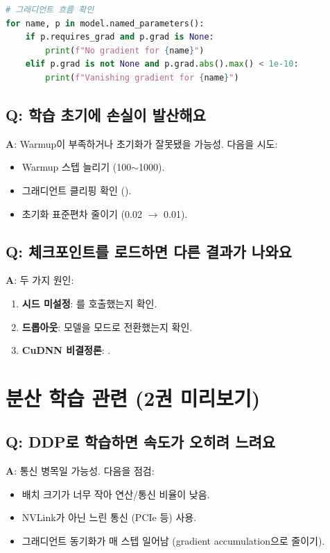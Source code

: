 \begin{lstlisting}[language=Python]
# 그래디언트 흐름 확인
for name, p in model.named_parameters():
    if p.requires_grad and p.grad is None:
        print(f"No gradient for {name}")
    elif p.grad is not None and p.grad.abs().max() < 1e-10:
        print(f"Vanishing gradient for {name}")
\end{lstlisting}

\subsection{Q: 학습 초기에 손실이 발산해요}

\textbf{A}: Warmup이 부족하거나 초기화가 잘못됐을 가능성. 다음을 시도:
\begin{itemize}
  \item Warmup 스텝 늘리기 (100$\sim$1000).
  \item 그래디언트 클리핑 확인 ().
  \item 초기화 표준편차 줄이기 (0.02 $\to$ 0.01).
\end{itemize}

\subsection{Q: 체크포인트를 로드하면 다른 결과가 나와요}

\textbf{A}: 두 가지 원인:
\begin{enumerate}
  \item \textbf{시드 미설정}: 를 호출했는지 확인.
  \item \textbf{드롭아웃}: 모델을  모드로 전환했는지 확인.
  \item \textbf{CuDNN 비결정론}: .
\end{enumerate}

\section{분산 학습 관련 (2권 미리보기)}

\subsection{Q: DDP로 학습하면 속도가 오히려 느려요}

\textbf{A}: 통신 병목일 가능성. 다음을 점검:
\begin{itemize}
  \item 배치 크기가 너무 작아 연산/통신 비율이 낮음.
  \item NVLink가 아닌 느린 통신 (PCIe 등) 사용.
  \item 그래디언트 동기화가 매 스텝 일어남 (gradient accumulation으로 줄이기).
\end{itemize}

